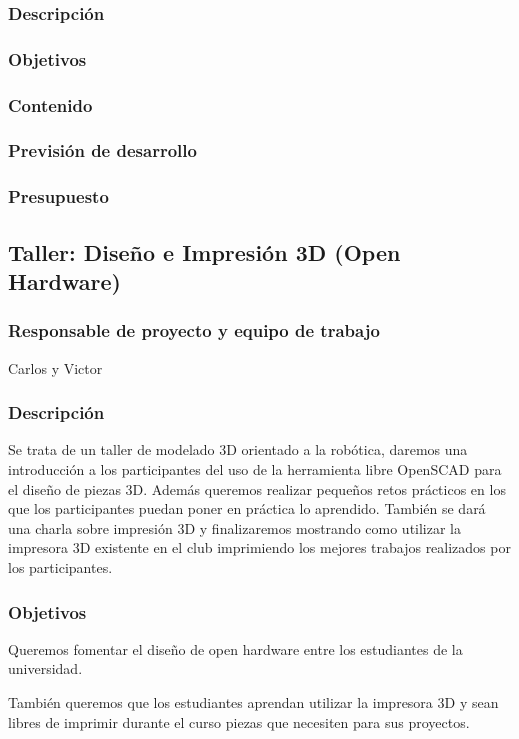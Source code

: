 \documentclass[12pt,twoside]{report}
\begin{document}
\subsubsection{Descripción}
\subsubsection{Objetivos}
\subsubsection{Contenido}
\subsubsection{Previsión de desarrollo}
\subsubsection{Presupuesto}


\subsection{Taller: Diseño e Impresión 3D (Open Hardware)}
\subsubsection{Responsable de proyecto y equipo de trabajo}
Carlos y Victor
\subsubsection{Descripción}
Se trata de un taller de modelado 3D orientado a la robótica, daremos una introducción a los participantes del uso de la herramienta libre OpenSCAD para el diseño de piezas 3D. Además queremos realizar pequeños retos prácticos en los que los participantes puedan poner en práctica lo aprendido. También se dará una charla sobre impresión 3D y finalizaremos mostrando como utilizar la impresora 3D existente en el club imprimiendo los mejores trabajos realizados por los participantes.
\subsubsection{Objetivos}
Queremos fomentar el diseño de open hardware entre los estudiantes de la universidad.

También queremos que los estudiantes aprendan utilizar la impresora 3D y sean libres de imprimir durante el curso piezas que necesiten para sus proyectos.
\end{document}
